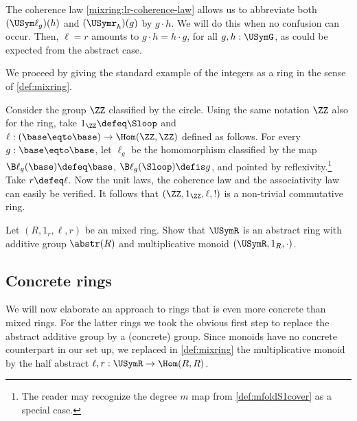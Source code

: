 The coherence law \ref{mixring:lr-coherence-law} allows us to abbreviate both 
$(\USym\ell_g)(h)$ and $(\USymr_h)(g)$ by $g\cdot h$. We will do this when
no confusion can occur. Then, $\ell=r$ 
amounts to $g\cdot h = h\cdot g$, for all $g,h : \USymG$,
as could be expected from the abstract case.

We proceed by giving the standard example of the integers as a ring
in the sense of \cref{def:mixring}.
\begin{example}
Consider the group $\ZZ$ classified by the circle.
Using the same notation $\ZZ$ also for the ring, take $1_\ZZ \defeq\Sloop$
and $\ell: (\base\eqto\base)\to\Hom(\ZZ,\ZZ)$ defined as follows.
For every $g:\base\eqto\base$, let $\ell_g$ be the homomorphism
classified by the map $\B\ell_g(\base)\defeq\base$, 
$\B\ell_g(\Sloop)\defis g$, and pointed by reflexivity.\footnote{%
The reader may recognize the degree $m$
map from \cref{def:mfoldS1cover} as a special case.}
Take $r\defeq\ell$. Now the unit laws, the coherence law and
the associativity law can easily be verified. It follows that
$(\ZZ,1_\ZZ,\ell,!)$ is a non-trivial commutative ring.
\end{example}


\begin{xca}\label{xca:Rmixring->URabstring}
Let $(R,1_r,\ell,r)$ be an mixed ring. 
Show that $\USymR$ is an abstract ring with
additive group $\abstr(R)$ and multiplicative 
monoid $(\USymR,1_R,\cdot)$. 
\end{xca}

\subsection{Concrete rings}\label{sec:concrings}

We will now elaborate an approach to rings that is even more concrete
than mixed rings. For the latter rings we took the
obvious first step to replace the abstract additive group by a 
(concrete) group. Since monoids have no concrete counterpart in our set up,
we replaced in \cref{def:mixring} the multiplicative monoid 
by the half abstract $\ell,r:\USymR\to\Hom(R,R)$.

